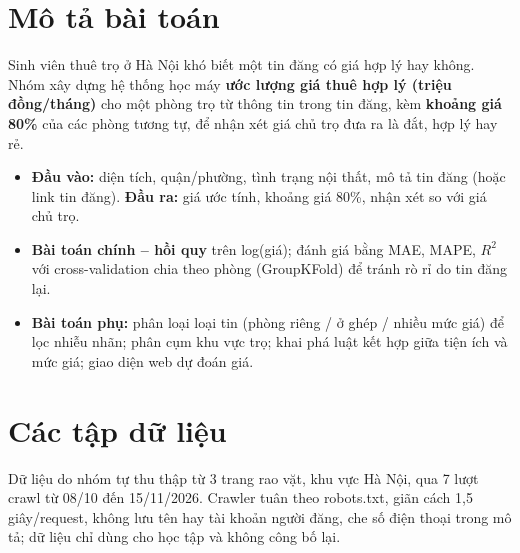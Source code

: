 \documentclass[11pt,a4paper]{article}
\begin{document}
\section{Mô tả bài toán}
Sinh viên thuê trọ ở Hà Nội khó biết một tin đăng có giá hợp lý hay không. Nhóm xây dựng hệ thống học máy
\textbf{ước lượng giá thuê hợp lý (triệu đồng/tháng)} cho một phòng trọ từ thông tin trong tin đăng, kèm
\textbf{khoảng giá 80\%} của các phòng tương tự, để nhận xét giá chủ trọ đưa ra là đắt, hợp lý hay rẻ.
\begin{itemize}
  \item \textbf{Đầu vào:} diện tích, quận/phường, tình trạng nội thất, mô tả tin đăng (hoặc link tin đăng).
        \textbf{Đầu ra:} giá ước tính, khoảng giá 80\%, nhận xét so với giá chủ trọ.
  \item \textbf{Bài toán chính -- hồi quy} trên log(giá); đánh giá bằng MAE, MAPE, $R^2$ với
        cross-validation chia theo phòng (GroupKFold) để tránh rò rỉ do tin đăng lại.
  \item \textbf{Bài toán phụ:} phân loại loại tin (phòng riêng / ở ghép / nhiều mức giá) để lọc nhiễu nhãn;
        phân cụm khu vực trọ; khai phá luật kết hợp giữa tiện ích và mức giá; giao diện web dự đoán giá.
\end{itemize}

\section{Các tập dữ liệu}
Dữ liệu do nhóm tự thu thập từ 3 trang rao vặt, khu vực Hà Nội, qua 7 lượt crawl từ 08/10 đến 15/11/2026.
Crawler tuân theo robots.txt, giãn cách 1,5 giây/request, không lưu tên hay tài khoản người đăng, che số điện thoại
trong mô tả; dữ liệu chỉ dùng cho học tập và không công bố lại.
\end{document}
